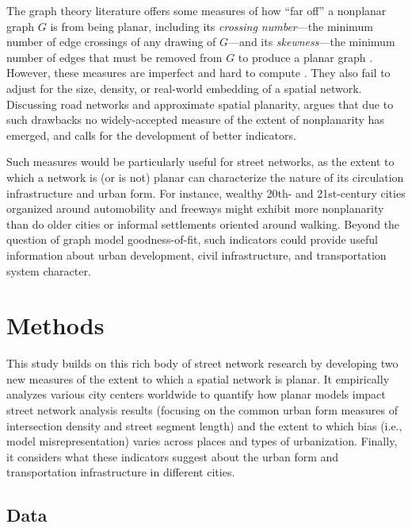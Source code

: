 \documentclass[Afour,sageh,times]{sagej}
\begin{document}
The graph theory literature offers some measures of how \enquote{far off} a nonplanar graph $G$ is from being planar, including its \emph{crossing number}---the minimum number of edge crossings of any drawing of $G$---and its \emph{skewness}---the minimum number of edges that must be removed from $G$ to produce a planar graph \citep{liebers_planarizing_2001,chimani_non-planar_2009}. However, these measures are imperfect and hard to compute \citep{szekely_successful_2004,chimani_vertex_2012}. They also fail to adjust for the size, density, or real-world embedding of a spatial network. Discussing road networks and approximate spatial planarity, \citet[p.~133]{newman_networks:_2010} argues that due to such drawbacks no widely-accepted measure of the extent of nonplanarity has emerged, and calls for the development of better indicators.

Such measures would be particularly useful for street networks, as the extent to which a network is (or is not) planar can characterize the nature of its circulation infrastructure and urban form. For instance, wealthy 20th- and 21st-century cities organized around automobility and freeways might exhibit more nonplanarity than do older cities or informal settlements oriented around walking. Beyond the question of graph model goodness-of-fit, such indicators could provide useful information about urban development, civil infrastructure, and transportation system character.



\section{Methods}

This study builds on this rich body of street network research by developing two new measures of the extent to which a spatial network is planar. It empirically analyzes various city centers worldwide to quantify how planar models impact street network analysis results (focusing on the common urban form measures of intersection density and street segment length) and the extent to which bias (i.e., model misrepresentation) varies across places and types of urbanization. Finally, it considers what these indicators suggest about the urban form and transportation infrastructure in different cities.

\subsection{Data}
\end{document}
